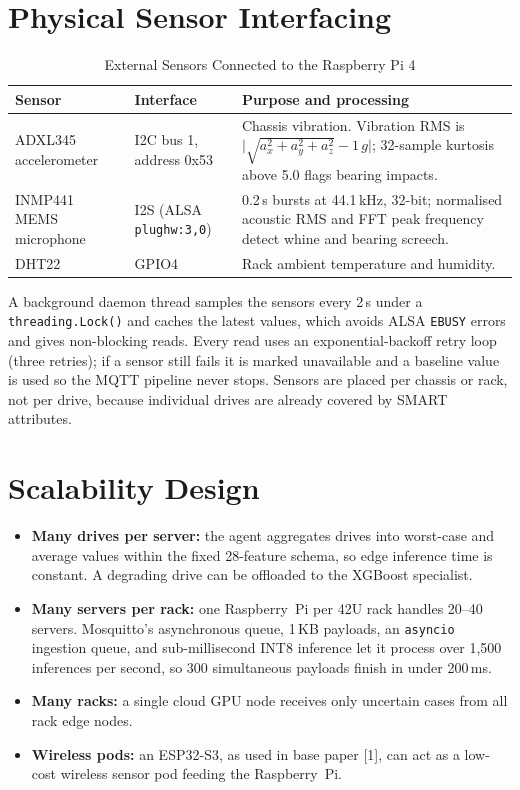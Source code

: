 \documentclass[12pt,a4paper]{report}
\begin{document}
\section{Physical Sensor Interfacing}

\begin{table}[h!]
  \centering
  \caption{External Sensors Connected to the Raspberry Pi 4}
  \label{tab:sensors}
  \vspace*{5pt}
  \footnotesize
  \renewcommand{\arraystretch}{1.4}
  \begin{tabular}{|p{2.3cm}|p{2.4cm}|p{8.3cm}|}
    \hline
    \textbf{Sensor} & \textbf{Interface} & \textbf{Purpose and processing} \\ \hline
    ADXL345 accelerometer & I2C bus 1, address 0x53 & Chassis vibration. Vibration RMS is $\big|\sqrt{a_x^2+a_y^2+a_z^2}-1\,g\big|$; 32-sample kurtosis above 5.0 flags bearing impacts. \\ \hline
    INMP441 MEMS microphone & I2S (ALSA \texttt{plughw:3,0}) & 0.2\,s bursts at 44.1\,kHz, 32-bit; normalised acoustic RMS and FFT peak frequency detect whine and bearing screech. \\ \hline
    DHT22 & GPIO4 & Rack ambient temperature and humidity. \\ \hline
  \end{tabular}
\end{table}

A background daemon thread samples the sensors every 2\,s under a \texttt{threading.Lock()} and caches the latest values, which avoids ALSA \texttt{EBUSY} errors and gives non-blocking reads. Every read uses an exponential-backoff retry loop (three retries); if a sensor still fails it is marked unavailable and a baseline value is used so the MQTT pipeline never stops. Sensors are placed per chassis or rack, not per drive, because individual drives are already covered by SMART attributes.

\section{Scalability Design}\label{sec:scaling}
\begin{itemize}
  \item \textbf{Many drives per server:} the agent aggregates drives into worst-case and average values within the fixed 28-feature schema, so edge inference time is constant. A degrading drive can be offloaded to the XGBoost specialist.
  \item \textbf{Many servers per rack:} one Raspberry~Pi per 42U rack handles 20--40 servers. Mosquitto's asynchronous queue, 1\,KB payloads, an \texttt{asyncio} ingestion queue, and sub-millisecond INT8 inference let it process over 1,500 inferences per second, so 300 simultaneous payloads finish in under 200\,ms.
  \item \textbf{Many racks:} a single cloud GPU node receives only uncertain cases from all rack edge nodes.
  \item \textbf{Wireless pods:} an ESP32-S3, as used in base paper [1], can act as a low-cost wireless sensor pod feeding the Raspberry~Pi.
\end{itemize}
\end{document}
